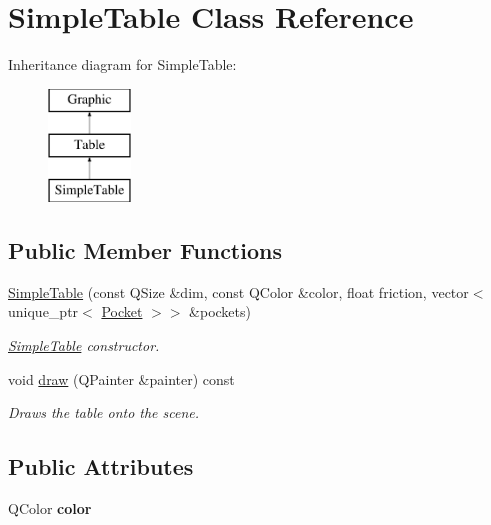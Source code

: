 \hypertarget{class_simple_table}{}\section{Simple\+Table Class Reference}
\label{class_simple_table}
Inheritance diagram for Simple\+Table\+:\begin{figure}[H]
\begin{center}
\leavevmode
\includegraphics[height=3.000000cm]{class_simple_table}
\end{center}
\end{figure}
\subsection*{Public Member Functions}
\begin{DoxyCompactItemize}
\item 
\mbox{\hyperlink{class_simple_table_a18bc58d5eb57cafc2e4121d034605c1b}{Simple\+Table}} (const Q\+Size \&dim, const Q\+Color \&color, float friction, vector$<$ unique\+\_\+ptr$<$ \mbox{\hyperlink{class_pocket}{Pocket}} $>$$>$ \&pockets)
\begin{DoxyCompactList}\small\item\em \mbox{\hyperlink{class_simple_table}{Simple\+Table}} constructor. \end{DoxyCompactList}\item 
void \mbox{\hyperlink{class_simple_table_aabb9fe0665f1145ba620c1f6ff9b5576}{draw}} (Q\+Painter \&painter) const
\begin{DoxyCompactList}\small\item\em Draws the table onto the scene. \end{DoxyCompactList}\end{DoxyCompactItemize}
\subsection*{Public Attributes}
\begin{DoxyCompactItemize}
\item 
\mbox{\label{class_simple_table_abe867fd6335990b297fe0b2e57154e06}} 
Q\+Color {\bfseries color}
\end{DoxyCompactItemize}



